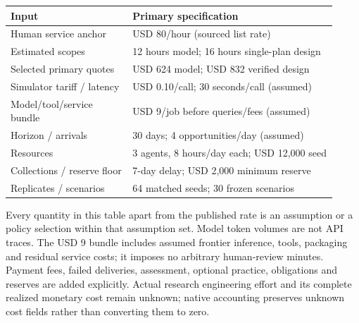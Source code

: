 \begin{center}\small\begin{tabular}{p{0.34\linewidth}p{0.58\linewidth}}
\toprule
Input & Primary specification \\ \midrule
Human service anchor & USD 80/hour (sourced list rate) \\
Estimated scopes & 12 hours model; 16 hours single-plan design \\
Selected primary quotes & USD 624 model; USD 832 verified design \\
Simulator tariff / latency & USD 0.10/call; 30 seconds/call (assumed) \\
Model/tool/service bundle & USD 9/job before queries/fees (assumed) \\
Horizon / arrivals & 30 days; 4 opportunities/day (assumed) \\
Resources & 3 agents, 8 hours/day each; USD 12,000 seed \\
Collections / reserve floor & 7-day delay; USD 2,000 minimum reserve \\
Replicates / scenarios & 64 matched seeds; 30 frozen scenarios \\
\bottomrule
\end{tabular}\end{center}
Every quantity in this table apart from the published rate is an assumption or a policy selection within that assumption set. Model token volumes are not API traces. The USD 9 bundle includes assumed frontier inference, tools, packaging and residual service costs; it imposes no arbitrary human-review minutes. Payment fees, failed deliveries, assessment, optional practice, obligations and reserves are added explicitly. Actual research engineering effort and its complete realized monetary cost remain unknown; native accounting preserves unknown cost fields rather than converting them to zero.
